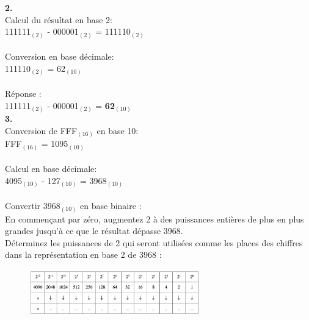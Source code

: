 \begin{Exercice}[20 minutes]
    \textbf{2.}\\
    Calcul du résultat en base 2:\\
    111111$_{(2)}$ - 000001$_{(2)}$ = 111110$_{(2)}$\\\\
    Conversion en base décimale:\\
    111110$_{(2)}$ = 62$_{(10)}$\\\\
    Réponse :\\
    111111$_{(2)}$ - 000001$_{(2)}$ = \textbf{62$_{(10)}$}\\

    \textbf{3.}\\
    Conversion de FFF$_{(16)}$ en base 10:\\
    FFF$_{(16)}$ = 1095$_{(10)}$\\\\
    Calcul en base décimale:\\
    4095$_{(10)}$ - 127$_{(10)}$ = 3968$_{(10)}$\\\\
    Convertir 3968$_{(10)}$ en base binaire :\\
    En commençant par zéro, augmentez 2 à des puissances entières de plus en plus grandes jusqu'à ce que le résultat dépasse 3968.\\
    Déterminez les puissances de 2 qui seront utilisées comme les places des chiffres dans la représentation en base 2 de 3968 :
    \begin{figure}[h]
        \includegraphics[width=0.66\textwidth]{img/7.3.png}
    \end{figure}


\end{Exercice}
